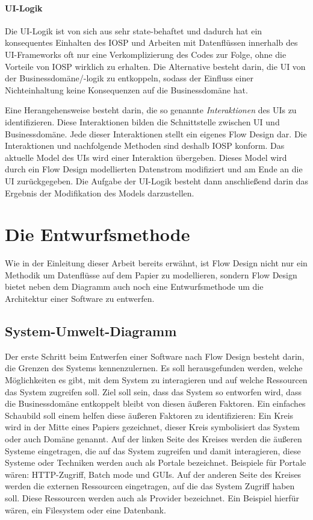 \subsubsection{UI-Logik}

Die UI-Logik ist von sich aus sehr state-behaftet und dadurch hat ein
konsequentes Einhalten des IOSP und Arbeiten mit Datenflüssen innerhalb des UI-Frameworks oft nur eine
Verkomplizierung des Codes zur Folge, ohne die Vorteile von IOSP wirklich zu
erhalten. Die Alternative besteht darin, die UI von der Businessdomäne/-logik zu
entkoppeln, sodass der Einfluss einer Nichteinhaltung keine Konsequenzen auf
die Businessdomäne hat.

Eine Herangehensweise besteht darin, die so genannte \emph{Interaktionen} des
UIs zu identifizieren. Diese Interaktionen bilden  die Schnittstelle
zwischen UI und Businessdomäne. Jede dieser Interaktionen stellt ein eigenes
Flow Design dar. Die Interaktionen und nachfolgende Methoden sind deshalb IOSP
konform. Das aktuelle Model des UIs wird einer Interaktion übergeben.
Dieses Model wird durch ein Flow Design modellierten Datenstrom modifiziert und am
Ende an die UI zurückgegeben. 
Die Aufgabe der UI-Logik besteht dann anschließend darin das Ergebnis der Modifikation des Models darzustellen.






\chapter{Die Entwurfsmethode}

Wie in der Einleitung dieser Arbeit bereits erwähnt, ist Flow Design nicht nur
ein Methodik um Datenflüsse auf dem Papier zu modellieren, sondern Flow Design
bietet neben dem Diagramm auch noch eine Entwurfsmethode um die Architektur einer Software
zu entwerfen.

\section{System-Umwelt-Diagramm}

Der erste Schritt beim Entwerfen einer Software nach Flow Design besteht
darin, die Grenzen des Systems kennenzulernen. Es soll herausgefunden
werden, welche Möglichkeiten es gibt, mit dem System zu interagieren und auf
welche Ressourcen das System zugreifen soll. Ziel soll sein, dass das System
so entworfen wird, dass die Businessdomäne entkoppelt bleibt von diesen
äußeren Faktoren.
Ein einfaches Schaubild soll einem helfen diese äußeren Faktoren zu
identifizieren: Ein Kreis wird in der Mitte eines Papiers gezeichnet, dieser
Kreis symbolisiert das System oder auch Domäne genannt.
Auf der linken Seite des Kreises werden die äußeren Systeme eingetragen, die
auf das System zugreifen und damit interagieren, diese Systeme oder
Techniken werden auch als Portale bezeichnet. Beispiele für Portale wären:
HTTP-Zugriff, Batch mode und GUIs.
Auf der anderen Seite des Kreises werden die externen Ressourcen eingetragen, auf die
das System Zugriff haben soll. Diese Ressourcen werden auch als Provider
bezeichnet. Ein Beispiel hierfür wären, ein Filesystem oder eine Datenbank.


